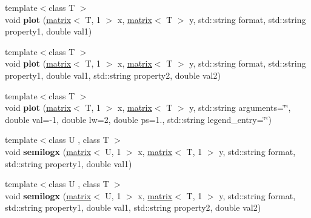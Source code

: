 \begin{DoxyCompactItemize}
\item 
\hypertarget{classkeycpp_1_1_figure_a6bda5ff8217267ad27af53d2bd3e0933}{{\footnotesize template$<$class T $>$ }\\void {\bfseries plot} (\hyperlink{classkeycpp_1_1matrix}{matrix}$<$ T, 1 $>$ x, \hyperlink{classkeycpp_1_1matrix}{matrix}$<$ T $>$ y, std\-::string format, std\-::string property1, double val1)}\label{classkeycpp_1_1_figure_a6bda5ff8217267ad27af53d2bd3e0933}

\item 
\hypertarget{classkeycpp_1_1_figure_a2e927307a66214a443fd30576ebb8830}{{\footnotesize template$<$class T $>$ }\\void {\bfseries plot} (\hyperlink{classkeycpp_1_1matrix}{matrix}$<$ T, 1 $>$ x, \hyperlink{classkeycpp_1_1matrix}{matrix}$<$ T $>$ y, std\-::string format, std\-::string property1, double val1, std\-::string property2, double val2)}\label{classkeycpp_1_1_figure_a2e927307a66214a443fd30576ebb8830}

\item 
\hypertarget{classkeycpp_1_1_figure_a2ce4e8bb56d156982d108657b21a8067}{{\footnotesize template$<$class T $>$ }\\void {\bfseries plot} (\hyperlink{classkeycpp_1_1matrix}{matrix}$<$ T, 1 $>$ x, \hyperlink{classkeycpp_1_1matrix}{matrix}$<$ T $>$ y, std\-::string arguments=\char`\"{}\char`\"{}, double val=-\/1, double lw=2, double ps=1., std\-::string legend\-\_\-entry=\char`\"{}\char`\"{})}\label{classkeycpp_1_1_figure_a2ce4e8bb56d156982d108657b21a8067}

\item 
\hypertarget{classkeycpp_1_1_figure_a60684bff54e496733aff380036e5d009}{{\footnotesize template$<$class U , class T $>$ }\\void {\bfseries semilogx} (\hyperlink{classkeycpp_1_1matrix}{matrix}$<$ U, 1 $>$ x, \hyperlink{classkeycpp_1_1matrix}{matrix}$<$ T, 1 $>$ y, std\-::string format, std\-::string property1, double val1)}\label{classkeycpp_1_1_figure_a60684bff54e496733aff380036e5d009}

\item 
\hypertarget{classkeycpp_1_1_figure_ad2e51044ad2b47b13249553cb62ff549}{{\footnotesize template$<$class U , class T $>$ }\\void {\bfseries semilogx} (\hyperlink{classkeycpp_1_1matrix}{matrix}$<$ U, 1 $>$ x, \hyperlink{classkeycpp_1_1matrix}{matrix}$<$ T, 1 $>$ y, std\-::string format, std\-::string property1, double val1, std\-::string property2, double val2)}\label{classkeycpp_1_1_figure_ad2e51044ad2b47b13249553cb62ff549}


\end{DoxyCompactItemize}
